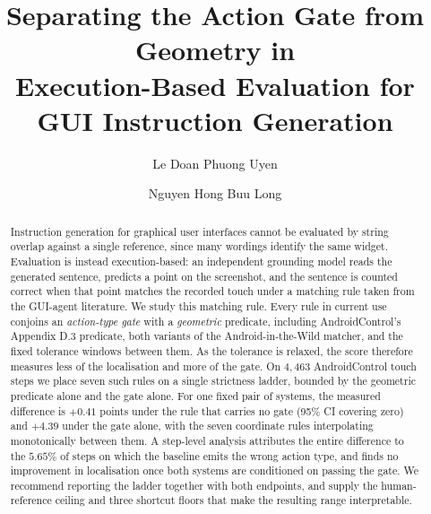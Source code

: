 \documentclass[runningheads,a4paper]{llncs}
\begin{document}
\pagestyle{empty}          %

\title{Separating the Action Gate from Geometry in\\ Execution-Based Evaluation for GUI Instruction Generation}


\author{Le Doan Phuong Uyen \and Nguyen Hong Buu Long}



\maketitle
\thispagestyle{empty}      %

\begin{abstract}
Instruction generation for graphical user interfaces cannot be evaluated by string overlap
against a single reference, since many wordings identify the same widget. Evaluation is instead
execution-based: an independent grounding model reads the generated sentence,
predicts a point on the screenshot, and the sentence is counted correct when that point matches
the recorded touch under a matching rule taken from the GUI-agent literature. We study this matching rule. Every rule in current use conjoins an
\emph{action-type gate} with a \emph{geometric} predicate, including AndroidControl's
Appendix D.3 predicate, both variants of the Android-in-the-Wild matcher, and the fixed
tolerance windows between them. As the tolerance is relaxed, the score therefore measures
less of the localisation and more of the gate. On $4{,}463$ AndroidControl touch steps we place seven such
rules on a single strictness ladder, bounded by the geometric predicate alone and the gate alone. For one fixed pair of
systems, the measured difference is $+0.41$ points under the rule that carries no gate
(95\% CI covering zero) and $+4.39$ under the gate alone, with the seven coordinate rules interpolating
monotonically between them. A step-level analysis attributes the entire difference to the $5.65\%$ of steps on
which the baseline emits the wrong action type, and finds no improvement in localisation once
both systems are conditioned on passing the gate. We recommend reporting the ladder together
with both endpoints, and supply the human-reference ceiling and three shortcut floors that make
the resulting range interpretable.

\end{abstract}
\end{document}
